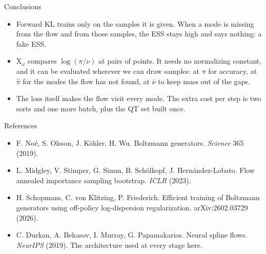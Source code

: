 \documentclass{beamer}
\newcommand{\red}{\color{red!80!black}}
\newcommand{\X}{\mathrm{X}}
\begin{document}
\begin{frame}{Conclusions}
	\small
	\begin{itemize}
		\setlength{\itemsep}{9pt}
		\item Forward KL trains only on the samples it is given. When a mode is missing from the flow and from those samples, the ESS stays high and says nothing: a {\red fake ESS}.
		\item $\X_\omega$ compares $\log(\pi/\nu)$ at pairs of points. It needs no normalizing constant, and it can be evaluated wherever we can draw samples: at $\pi$ for accuracy, at $\hat\pi$ for the modes the flow has not found, at $\bar\nu$ to keep mass out of the gaps.
		\item The loss itself makes the flow {\red visit every mode}. The extra cost per step is two sorts and one more batch, plus the QT set built once.
	\end{itemize}
\end{frame}

\begin{frame}{References}
	\footnotesize
	\begin{itemize}
		\setlength{\itemsep}{5pt}
		\item F. No\'e, S. Olsson, J. K\"ohler, H. Wu. Boltzmann generators. \textit{Science} 365 (2019).
		\item L. Midgley, V. Stimper, G. Simm, B. Sch\"olkopf, J. Hern\'andez-Lobato. Flow annealed importance sampling bootstrap. \textit{ICLR} (2023).
		\item H. Schopmans, C. von Klitzing, P. Friederich. Efficient training of Boltzmann generators using off-policy log-dispersion regularization. arXiv:2602.03729 (2026).
		\item C. Durkan, A. Bekasov, I. Murray, G. Papamakarios. Neural spline flows. \textit{NeurIPS} (2019). The architecture used at every stage here.
	\end{itemize}
\end{frame}
\end{document}
